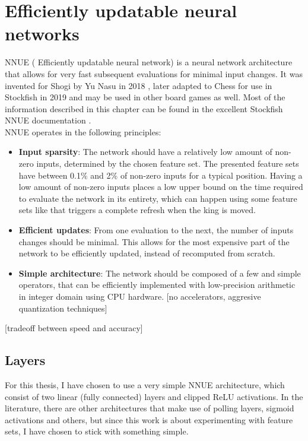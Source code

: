 \section{Efficiently updatable neural networks}

NNUE ( Efficiently updatable neural network) is a neural network architecture that allows for very fast subsequent evaluations for minimal input changes. It was invented for Shogi by Yu Nasu in 2018 \cite{nnue:2018}, later adapted to Chess for use in Stockfish in 2019 and may be used in other board games as well. Most of the information described in this chapter can be found in the excellent Stockfish NNUE documentation \cite{nnue-pytorch}. \\

NNUE operates in the following principles:

\begin{itemize}
    \item \textbf{Input sparsity}: The network should have a relatively low amount of non-zero inputs, determined by the chosen feature set. The presented feature sets have between 0.1\% and 2\% of non-zero inputs for a typical position. Having a low amount of non-zero inputs places a low upper bound on the time required to evaluate the network in its entirety, which can happen using some feature sets like  that triggers a complete refresh when the king is moved.
    \item \textbf{Efficient updates}: From one evaluation to the next, the number of inputs changes should be minimal. This allows for the most expensive part of the network to be efficiently updated, instead of recomputed from scratch.
    \item \textbf{Simple architecture}: The network should be composed of a few and simple operators, that can be efficiently implemented with low-precision arithmetic in integer domain using CPU hardware. [no accelerators, aggresive quantization techniques]
\end{itemize}

[tradeoff between speed and accuracy]

\subsection{Layers}

For this thesis, I have chosen to use a very simple NNUE architecture, which consist of two linear (fully connected) layers and clipped ReLU activations. In the literature, there are other architectures that make use of polling layers, sigmoid activations and others, but since this work is about experimenting with feature sets, I have chosen to stick with something simple.

